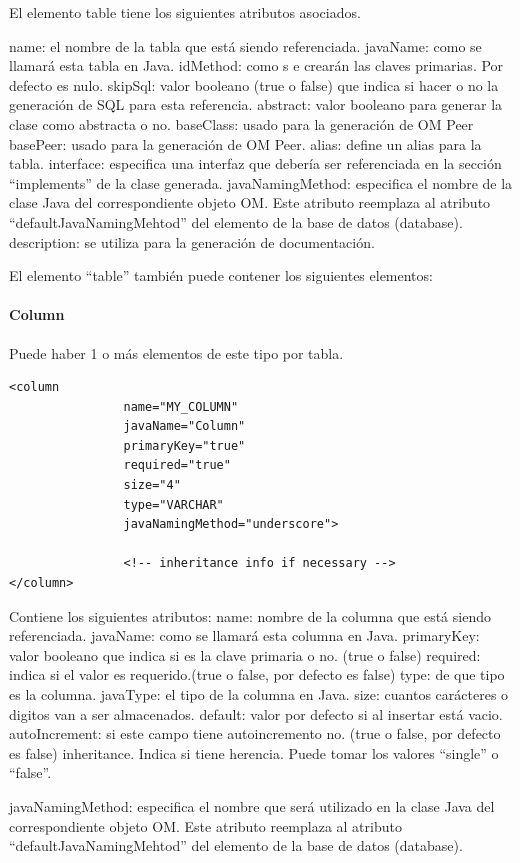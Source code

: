 \documentclass[12pt, oneside]{article}
\begin{document}
El elemento table tiene los siguientes atributos asociados.

name: el nombre de la tabla que está siendo referenciada.
javaName: como se llamará esta tabla en Java.
idMethod: como s e crearán las claves primarias. Por defecto es nulo.
skipSql: valor booleano (true o false) que indica si hacer o no la generación de SQL para esta referencia.
abstract: valor booleano para generar la clase como abstracta o no.
baseClass: usado para la generación de OM Peer
basePeer: usado para la generación de OM Peer.
alias: define un alias para la tabla.
interface: especifica una interfaz que debería ser referenciada en la sección “implements” de la clase generada.
javaNamingMethod: especifica el nombre de la clase Java del correspondiente objeto OM. Este atributo reemplaza al atributo “defaultJavaNamingMehtod” del elemento de la base de datos (database).
description: se utiliza para la generación de documentación.

El elemento “table” también puede contener los siguientes elementos:

\paragraph{Column}
Puede haber 1 o más elementos de este tipo por tabla.

\begin{lstlisting}
<column
           		name="MY_COLUMN"
           		javaName="Column"
           		primaryKey="true"
           		required="true"
           		size="4"
           		type="VARCHAR"
           		javaNamingMethod="underscore">

           		<!-- inheritance info if necessary -->
</column>
\end{lstlisting}

Contiene los siguientes atributos:
name: nombre de la columna que está siendo referenciada.
javaName: como se llamará esta columna en Java.
primaryKey: valor booleano que indica si es la clave primaria o no. (true o false)
required: indica si el valor es requerido.(true o false, por defecto es false)
type: de que tipo es la columna.
javaType: el tipo de la columna en Java.
size: cuantos carácteres o digitos van a ser almacenados.
default: valor por defecto si al insertar está vacio.
autoIncrement: si este campo tiene autoincremento no. (true o false, por defecto es false)
inheritance. Indica si tiene herencia. Puede tomar los valores “single” o “false”.

javaNamingMethod: especifica el nombre que será utilizado en la clase Java del correspondiente objeto OM. Este atributo reemplaza al atributo “defaultJavaNamingMehtod” del elemento de la base de datos (database).
\end{document}
